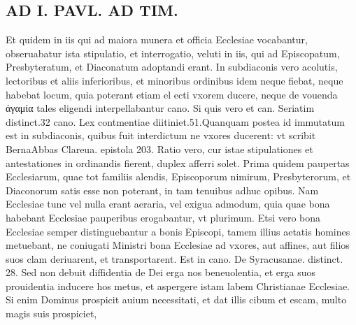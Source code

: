 \documentclass{article}
\begin{document}
\begin{pages}
\section*{AD I. PAVL. AD TIM. }
\marginpar{[ p.114 ]}\pstart Et quidem in iis qui ad maiora munera et officia Ecclesiae vocabantur, obseruabatur ista stipulatio, et interrogatio, veluti in iis, qui ad Episcopatum, Presbyteratum, et Diaconatum adoptandi erant. In subdiaconis vero acolutis, lectoribus et aliis inferioribus, et minoribus ordinibus idem neque fiebat, neque habebat locum, quia poterant etiam el ecti vxorem ducere, neque de vouenda ἀγαμία tales eligendi interpellabantur cano. Si quis vero et can. Seriatim distinct.32 cano. Lex contmentiae diitiniet.51.Quanquam postea id immutatum est in subdiaconis, quibus fuit interdictum ne vxores ducerent: vt scribit BernaAbbas Clareua. epistola 203.  \pend\pstart Ratio vero, cur istae stipulationes et antestationes in ordinandis fierent, duplex afferri solet. Prima quidem paupertas Ecclesiarum, quae tot familiis alendis, Episcoporum nimirum, Presbyterorum, et Diaconorum satis esse non poterant, in tam tenuibus adhuc opibus. Nam Ecclesiae tunc vel nulla erant aeraria, vel exigua admodum, quia quae bona habebant Ecclesiae pauperibus erogabantur, vt plurimum. Etsi vero bona Ecclesiae semper distinguebantur a bonis Episcopi, tamem illius aetatis homines metuebant, ne coniugati Ministri bona Ecclesiae ad vxores, aut affines, aut filios suos clam deriuarent, et transportarent. Est in cano. De Syracusanae. distinct. 28. Sed non debuit diffidentia de Dei erga nos beneuolentia, et erga suos prouidentia inducere hos metus, et aspergere istam labem Christianae Ecclesiae. Si enim Dominus prospicit auium necessitati, et dat illis cibum et escam, multo magis suis prospiciet,  \pend

\end{pages}
\end{document}
